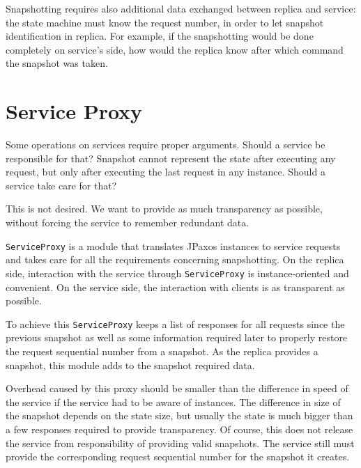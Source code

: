 Snapshotting requires also additional data exchanged between replica and service: the state machine must know the request number, in order to let snapshot identification in replica. For example, if the snapshotting would be done completely on service's side, how would the replica know after which command the snapshot was taken.


\section{Service Proxy}
\label{sec:serviceProxy}

Some operations on services require proper arguments. Should a service be responsible for that? Snapshot cannot represent the state after executing any request, but only after executing the last request in any instance. Should a service take care for that?

This is not desired. We want to provide as much transparency as possible, without forcing the service to remember redundant data.

\texttt{ServiceProxy} is a module that translates JPaxos instances to service requests and takes care for all the requirements concerning snapshotting. On the replica side, interaction with the service through \texttt{ServiceProxy} is instance-oriented and convenient. On the service side, the interaction with clients is as transparent as possible.

To achieve this \texttt{ServiceProxy} keeps a list of responses for all requests since the previous snapshot as well as some information required later to properly restore the
request sequential number %
from a snapshot.
As the replica provides a snapshot, this module adds to the snapshot required data.

Overhead caused by this proxy should be smaller than the difference in speed of the service if the service had to be aware of instances. The difference in size of the snapshot depends on the state size, but usually the state is much bigger than a few responses required to provide transparency.
Of course, this does not release the service from responsibility of providing valid snapshots. The service still must provide the corresponding 
request sequential number %
for the snapshot it creates.
